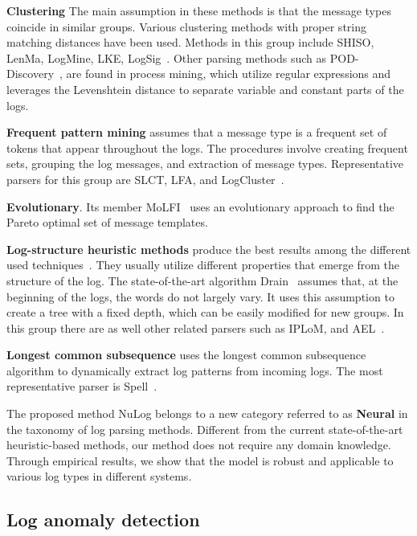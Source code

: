 \textbf{Clustering} The main assumption in these methods is that the message types coincide in similar groups. Various clustering methods with proper string matching distances have been used. Methods in this group include SHISO, LenMa, LogMine, LKE, LogSig~\cite{mizutani2013incremental, shima2016length,hamooni2016logmine, fu2009execution, tang2011logsig}. Other parsing methods such as POD-Discovery~\cite{imweber2015}, are found in process mining, which utilize regular expressions and leverages the Levenshtein distance to separate variable and constant parts of the logs.

\textbf{Frequent pattern mining} assumes that a message type is a frequent set of tokens that appear throughout the logs. The procedures involve creating frequent sets, grouping the log messages, and extraction of message types. Representative parsers for this group are SLCT, LFA, and LogCluster~\cite{xu2009detecting, nagappan2010abstracting, nandi2016anomaly}.


\textbf{Evolutionary}. Its member MoLFI~\cite{messaoudi2018search} uses an evolutionary approach to find the Pareto optimal set of message templates.

\textbf{Log-structure heuristic methods} produce the best results among the different used techniques~\cite{zhu2019tools,he2016evaluation}. They usually utilize different properties that emerge from the structure of the log. The state-of-the-art algorithm Drain~\cite{he2017drain} assumes that, at the beginning of the logs, the words do not largely vary. It uses this assumption to create a tree with a fixed depth, which can be easily modified for new groups. In this group there are as well other related parsers such as IPLoM, and AEL~\cite{xu2009detecting, jiang2008automated}.

\textbf{Longest common subsequence} uses the longest common subsequence algorithm to dynamically extract log patterns from incoming logs. The most representative parser is Spell~\cite{du2016spell}.

The proposed method NuLog belongs to a new category referred to as \textbf{Neural} in the taxonomy of log parsing methods. Different from the current state-of-the-art heuristic-based methods, our method does not require any domain knowledge. Through empirical results, we show that the model is robust and applicable to various log types in different systems.

\subsection{Log anomaly detection}

